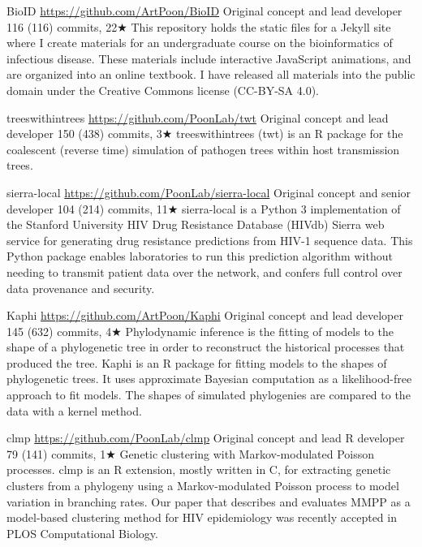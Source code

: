 {BioID}
{\url{https://github.com/ArtPoon/BioID}}
{Original concept and lead developer}
{116 (116) commits, 22$\bigstar$}
{This repository holds the static files for a Jekyll site where I create materials for an undergraduate course on the bioinformatics of infectious disease.  These materials include interactive JavaScript animations, and are organized into an online textbook.  I have released all materials into the public domain under the Creative Commons license (CC-BY-SA 4.0).}



{treeswithintrees}
{\url{https://github.com/PoonLab/twt}}
{Original concept and lead developer}
{150 (438) commits, 3$\bigstar$}
{treeswithintrees (twt) is an R package for the coalescent (reverse time) simulation of pathogen trees within host transmission trees.}


{sierra-local}
{\url{https://github.com/PoonLab/sierra-local}}
{Original concept and senior developer}
{104 (214) commits, 11$\bigstar$}
{sierra-local is a Python 3 implementation of the Stanford University HIV Drug Resistance Database (HIVdb) Sierra web service for generating drug resistance predictions from HIV-1 sequence data. This Python package enables laboratories to run this prediction algorithm without needing to transmit patient data over the network, and confers full control over data provenance and security.}


{Kaphi}
{\url{https://github.com/ArtPoon/Kaphi}}
{Original concept and lead developer}
{145 (632) commits, 4$\bigstar$}
{Phylodynamic inference is the fitting of models to the shape of a phylogenetic tree in order to reconstruct the historical processes that produced the tree.
Kaphi is an R package for fitting models to the shapes of phylogenetic trees.
It uses approximate Bayesian computation as a likelihood-free approach to fit models.
The shapes of simulated phylogenies are compared to the data with a kernel method.}



{clmp}
{\url{https://github.com/PoonLab/clmp}}
{Original concept and lead R developer}
{79 (141) commits, 1$\bigstar$}
{Genetic clustering with Markov-modulated Poisson processes. 
clmp is an R extension, mostly written in C, for extracting genetic clusters from a phylogeny using a Markov-modulated Poisson process to model variation in branching rates. Our paper that describes and evaluates MMPP as a model-based clustering method for HIV epidemiology was recently accepted in PLOS Computational Biology.
}


